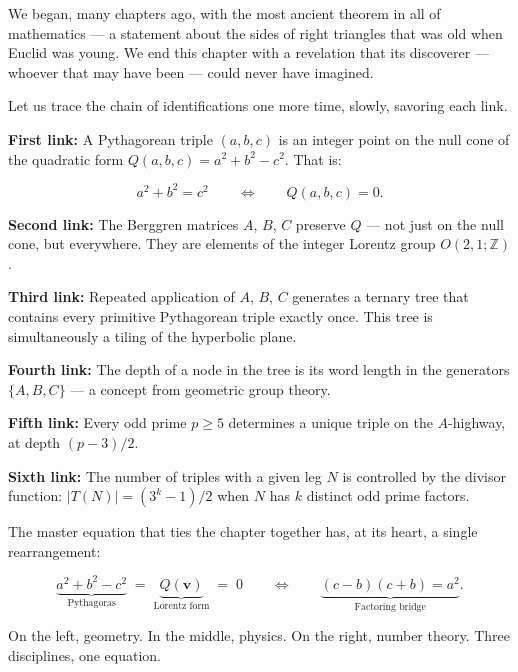 \documentclass[12pt, letterpaper, openany]{book}
\theoremstyle{definition}
\theoremstyle{remark}
\begin{document}
We began, many chapters ago, with the most ancient theorem in all of mathematics --- a statement about the sides of right triangles that was old when Euclid was young. We end this chapter with a revelation that its discoverer --- whoever that may have been --- could never have imagined.

Let us trace the chain of identifications one more time, slowly, savoring each link.

\textbf{First link:} A Pythagorean triple $(a, b, c)$ is an integer point on the null cone of the quadratic form $Q(a, b, c) = a^2 + b^2 - c^2$. That is:

\[
a^2 + b^2 = c^2 \qquad\Longleftrightarrow\qquad Q(a, b, c) = 0.
\]

\textbf{Second link:} The Berggren matrices $A$, $B$, $C$ preserve $Q$ --- not just on the null cone, but everywhere. They are elements of the integer Lorentz group $O(2,1; \mathbb{Z})$.

\textbf{Third link:} Repeated application of $A$, $B$, $C$ generates a ternary tree that contains every primitive Pythagorean triple exactly once. This tree is simultaneously a tiling of the hyperbolic plane.

\textbf{Fourth link:} The depth of a node in the tree is its word length in the generators $\{A, B, C\}$ --- a concept from geometric group theory.

\textbf{Fifth link:} Every odd prime $p \geq 5$ determines a unique triple on the $A$-highway, at depth $(p - 3)/2$.

\textbf{Sixth link:} The number of triples with a given leg $N$ is controlled by the divisor function: $|T(N)| = (3^k - 1)/2$ when $N$ has $k$ distinct odd prime factors.

The master equation that ties the chapter together has, at its heart, a single rearrangement:

\[
\underbrace{a^2 + b^2 - c^2}_{\text{Pythagoras}} \;=\; \underbrace{Q(\mathbf{v})}_{\text{Lorentz form}} \;=\; 0 \qquad\Longleftrightarrow\qquad \underbrace{(c - b)(c + b) = a^2}_{\text{Factoring bridge}}.
\]

On the left, geometry. In the middle, physics. On the right, number theory. Three disciplines, one equation.
\end{document}
